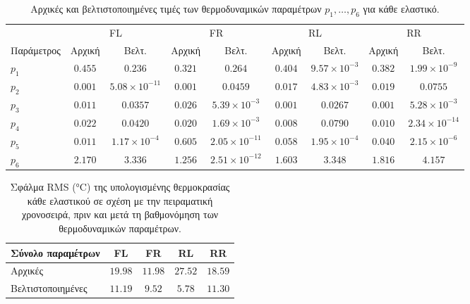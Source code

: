 \FloatBarrier

\begin{table}[htbp!]
    \centering
    \footnotesize
    \setlength{\tabcolsep}{4pt}
    \begin{tabular}{l cc cc cc cc}
        \toprule
        & \multicolumn{2}{c}{FL} & \multicolumn{2}{c}{FR} & \multicolumn{2}{c}{RL} & \multicolumn{2}{c}{RR} \\
        \cmidrule(lr){2-3} \cmidrule(lr){4-5} \cmidrule(lr){6-7} \cmidrule(lr){8-9}
        Παράμετρος & Αρχική & Βελτ. & Αρχική & Βελτ. & Αρχική & Βελτ. & Αρχική & Βελτ. \\
        \midrule
        $p_1$ & $0.455$ & $0.236$ & $0.321$ & $0.264$ & $0.404$ & $9.57\!\times\!10^{-3}$ & $0.382$ & $1.99\!\times\!10^{-9}$ \\
        $p_2$ & $0.001$ & $5.08\!\times\!10^{-11}$ & $0.001$ & $0.0459$ & $0.017$ & $4.83\!\times\!10^{-3}$ & $0.019$ & $0.0755$ \\
        $p_3$ & $0.011$ & $0.0357$ & $0.026$ & $5.39\!\times\!10^{-3}$ & $0.001$ & $0.0267$ & $0.001$ & $5.28\!\times\!10^{-3}$ \\
        $p_4$ & $0.022$ & $0.0420$ & $0.020$ & $1.69\!\times\!10^{-3}$ & $0.008$ & $0.0790$ & $0.010$ & $2.34\!\times\!10^{-14}$ \\
        $p_5$ & $0.011$ & $1.17\!\times\!10^{-4}$ & $0.605$ & $2.05\!\times\!10^{-11}$ & $0.058$ & $1.95\!\times\!10^{-4}$ & $0.040$ & $2.15\!\times\!10^{-6}$ \\
        $p_6$ & $2.170$ & $3.336$ & $1.256$ & $2.51\!\times\!10^{-12}$ & $1.603$ & $3.348$ & $1.816$ & $4.157$ \\
        \bottomrule
    \end{tabular}
    \caption{Αρχικές και βελτιστοποιημένες τιμές των θερμοδυναμικών παραμέτρων $p_1,\ldots,p_6$ για κάθε ελαστικό.}
    \label{tab:thermalParamsOrigVsOpt}
\end{table}

\begin{table}[htbp!]
    \centering
    \footnotesize
    \setlength{\tabcolsep}{6pt}
    \begin{tabular}{l cccc}
        \toprule
        Σύνολο παραμέτρων & FL & FR & RL & RR \\
        \midrule
        Αρχικές          & $19.98$ & $11.98$ & $27.52$ & $18.59$ \\
        Βελτιστοποιημένες & $11.19$ & $9.52$ & $5.78$ & $11.30$ \\
        \bottomrule
    \end{tabular}
    \caption{Σφάλμα RMS (\si{\celsius}) της υπολογισμένης θερμοκρασίας κάθε ελαστικού σε σχέση με την πειραματική χρονοσειρά, πριν και μετά τη βαθμονόμηση των θερμοδυναμικών παραμέτρων.}
    \label{tab:thermalParamsRMSE}
\end{table}

\FloatBarrier
